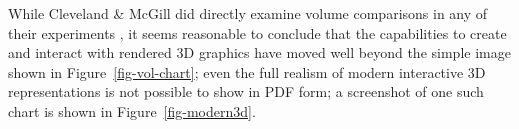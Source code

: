 \documentclass[runningheads
]{llncs}
\begin{document}
While Cleveland \& McGill did directly examine volume comparisons in any
of their experiments
\autocite{clevelandGraphicalPerceptionTheory1984,clevelandGraphicalPerceptionGraphical1985,clevelandGraphicalPerceptionVisual1987},
it seems reasonable to conclude that the capabilities to create and
interact with rendered 3D graphics have moved well beyond the simple
image shown in Figure~\ref{fig-vol-chart}; even the full realism of
modern interactive 3D representations is not possible to show in PDF
form; a screenshot of one such chart is shown in
Figure~\ref{fig-modern3d}.

\begin{figure}

\begin{minipage}[t]{0.48\linewidth}

{\centering 


}

\end{minipage}%
%
\begin{minipage}[t]{0.05\linewidth}

{\centering 

~

}

\end{minipage}%
%
\begin{minipage}[t]{0.48\linewidth}

{\centering 

}
\end{minipage}
\end{figure}
\end{document}
